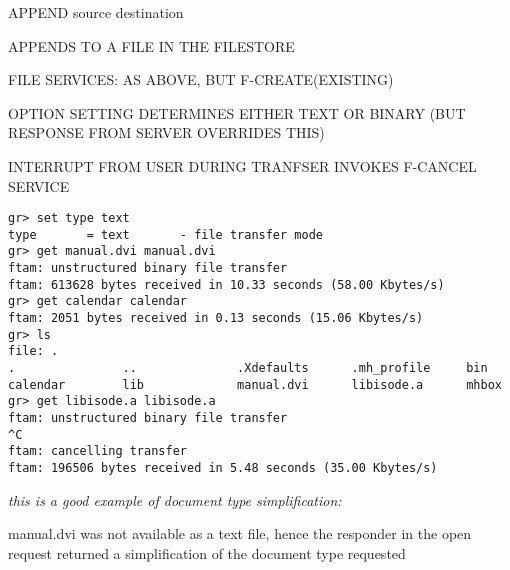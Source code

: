 \begin{bwslide}

\begin{nrtc}
\item	APPEND source destination
    \begin{nrtc}
    \item	APPENDS TO A FILE IN THE FILESTORE

    \item	FILE SERVICES: AS ABOVE, BUT F-CREATE(EXISTING)
    \end{nrtc}

\item	OPTION SETTING DETERMINES EITHER TEXT OR BINARY
	(BUT RESPONSE FROM SERVER OVERRIDES THIS)

\item	INTERRUPT FROM USER DURING TRANFSER INVOKES F-CANCEL SERVICE
\end{nrtc}
\end{bwslide}


\begin{bwslide}
\small

\begin{verbatim}
gr> set type text
type       = text       - file transfer mode
gr> get manual.dvi manual.dvi
ftam: unstructured binary file transfer
ftam: 613628 bytes received in 10.33 seconds (58.00 Kbytes/s)
gr> get calendar calendar
ftam: 2051 bytes received in 0.13 seconds (15.06 Kbytes/s)
gr> ls
file: .
.               ..              .Xdefaults      .mh_profile     bin        
calendar        lib             manual.dvi      libisode.a      mhbox
gr> get libisode.a libisode.a
ftam: unstructured binary file transfer
^C
ftam: cancelling transfer
ftam: 196506 bytes received in 5.48 seconds (35.00 Kbytes/s)
\end{verbatim}
\end{bwslide}


\begin{note}\em
this is a good example of document type simplification:

manual.dvi was not available as a text file,
hence the responder in the open request returned a simplification of the
document type requested
\end{note}


